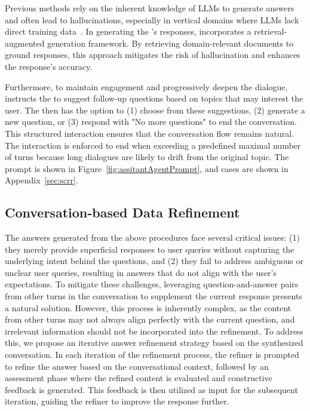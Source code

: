 Previous methods rely on the inherent knowledge of LLMs to generate answers and often lead to hallucinations, especially in vertical domains where LLMs lack direct training data~\cite{abdullin2024synthetic,liu2024chatqa}. In generating the \Assistant's responses, \ourmodel incorporates a retrieval-augmented generation framework. By retrieving domain-relevant documents to ground responses, this approach mitigates the risk of hallucination and enhances the response's accuracy.

Furthermore, to maintain engagement and progressively deepen the dialogue, \ourmodel instructs the \Assistant to suggest follow-up questions based on topics that may interest the user. The \Inquirer then has the option to (1) choose from these suggestions, (2) generate a new question, or (3) respond with "No more questions" to end the conversation. This structured interaction ensures that the conversation flow remains natural. The interaction is enforced to end when exceeding a predefined maximal number of turns because long dialogues are likely to drift from the original topic. The prompt is shown in Figure~\ref{fig:assitantAgentPrompt}, and cases are shown in Appendix~\ref{sec:scrr}.


\subsection{Conversation-based Data Refinement}
The answers generated from the above procedures face several critical issues: (1) they merely provide superficial responses to user queries without capturing the underlying intent behind the questions, and (2) they fail to address ambiguous or unclear user queries, resulting in answers that do not align with the user's expectations. To mitigate these challenges, leveraging question-and-answer pairs from other turns in the conversation to supplement the current response presents a natural solution. However, this process is inherently complex, as the content from other turns may not always align perfectly with the current question, and irrelevant information should not be incorporated into the refinement. To address this, we propose an iterative answer refinement strategy based on the synthesized conversation. In each iteration of the refinement process, the refiner is prompted to refine the answer based on the conversational context, followed by an assessment phase where the refined content is evaluated and constructive feedback is generated. This feedback is then utilized as input for the subsequent iteration, guiding the refiner to improve the response further.


